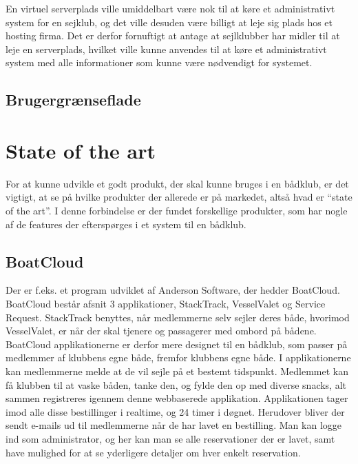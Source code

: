 En virtuel serverplads ville umiddelbart være nok til at køre et administrativt system for en sejklub, og det ville desuden være billigt at leje sig plads hos et hosting firma. Det er derfor fornuftigt at antage at sejlklubber har midler til at leje en serverplads, hvilket ville kunne anvendes til at køre et administrativt system med alle informationer som kunne være nødvendigt for systemet. 
\subsection*{Brugergrænseflade}


\section{State of the art}
For at kunne udvikle et godt produkt, der skal kunne bruges i en bådklub, er det vigtigt, at se på hvilke
produkter der allerede er på markedet, altså hvad er ``state of the art''. I denne forbindelse er der fundet
forskellige produkter, som har nogle af de features der efterspørges i et system til en bådklub. 
\newline
\subsection*{BoatCloud}
Der er f.eks.
et program udviklet af Anderson Software, der hedder BoatCloud.\citep{BoatCloud} BoatCloud består afsnit 3
applikationer, StackTrack, VesselValet og Service Request. StackTrack benyttes, når medlemmerne selv sejler
deres både, hvorimod VesselValet, er når der skal tjenere og passagerer med ombord på bådene. BoatCloud
applikationerne er derfor mere designet til en bådklub, som passer på medlemmer af klubbens egne både, fremfor
klubbens egne både. I applikationerne kan medlemmerne melde at de vil sejle på et bestemt tidspunkt. Medlemmet
kan få klubben til at vaske båden, tanke den, og fylde den op med diverse snacks, alt sammen registreres
igennem denne webbaserede applikation. Applikationen tager imod alle disse bestillinger i realtime, og 24
timer i døgnet. Herudover bliver der sendt e-mails ud til medlemmerne når de har lavet en bestilling. Man kan
logge ind som administrator, og her kan man se alle reservationer der er lavet, samt have mulighed for at
se yderligere detaljer om hver enkelt reservation.

